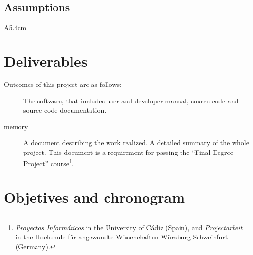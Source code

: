 \documentclass[twocolumn]{article}
\begin{document}
\subsection{Assumptions}
\begin{condlist}{A}{5.4cm}
\end{condlist}

\section{Deliverables}
Outcomes of this project are as follows:

\begin{description}
  \item[\fav] The \fav software, that includes user and developer
    manual, source code and source code documentation.
  \item[\favp memory] A document describing the work realized. A
    detailed summary of the whole project. This document is a
    requirement for passing the ``Final Degree Project''
    course\footnote{\textit{Proyectos Informáticos} in the University
      of Cádiz (Spain), and \textit{Projectarbeit} in the Hochshule
      für angewandte Wissenchaften Würzburg-Schweinfurt (Germany).}.
\end{description}

\section{Objetives and chronogram}
\end{document}
